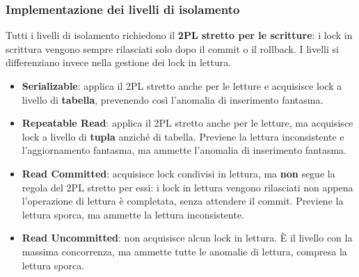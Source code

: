 \subsubsection{Implementazione dei livelli di isolamento}

Tutti i livelli di isolamento richiedono il \textbf{2PL stretto per le scritture}: i lock in scrittura vengono sempre rilasciati solo dopo il commit o il rollback. I livelli si differenziano invece nella gestione dei lock in lettura.

\begin{itemize}
	\item \textbf{Serializable}: applica il 2PL stretto anche per le letture e acquisisce lock a livello di \textbf{tabella}, prevenendo così l'anomalia di inserimento fantasma.
	
	\item \textbf{Repeatable Read}: applica il 2PL stretto anche per le letture, ma acquisisce lock a livello di \textbf{tupla} anziché di tabella. Previene la lettura inconsistente e l'aggiornamento fantasma, ma ammette l'anomalia di inserimento fantasma.
	
	\item \textbf{Read Committed}: acquisisce lock condivisi in lettura, ma \textbf{non} segue la regola del 2PL stretto per essi: i lock in lettura vengono rilasciati non appena l'operazione di lettura è completata, senza attendere il commit. Previene la lettura sporca, ma ammette la lettura inconsistente.
	
	\item \textbf{Read Uncommitted}: non acquisisce alcun lock in lettura. È il livello con la massima concorrenza, ma ammette tutte le anomalie di lettura, compresa la lettura sporca.
\end{itemize}